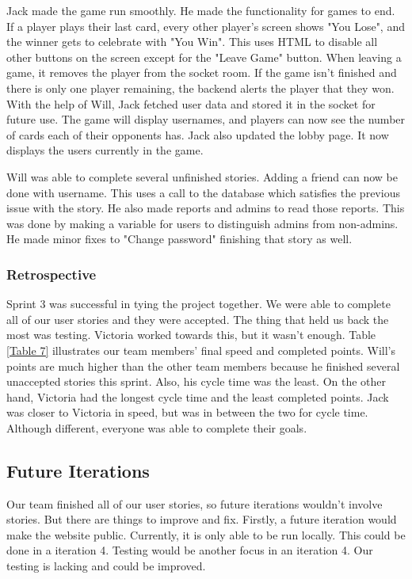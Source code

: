 Jack made the game run smoothly. He made the functionality for games to end. If a player plays their last card, every other player's screen shows "You Lose", and the winner gets to celebrate with "You Win". This uses HTML to disable all other buttons on the screen except for the "Leave Game" button. When leaving a game, it removes the player from the socket room. If the game isn't finished and there is only one player remaining, the backend alerts the player that they won. With the help of Will, Jack fetched user data and stored it in the socket for future use. The game will display usernames, and players can now see the number of cards each of their opponents has. Jack also updated the lobby page. It now displays the users currently in the game.

Will was able to complete several unfinished stories. Adding a friend can now be done with username. This uses a call to the database which satisfies the previous issue with the story. He also made reports and admins to read those reports. This was done by making a variable for users to distinguish admins from non-admins. He made minor fixes to "Change password" finishing that story as well.

\subsubsection{Retrospective}
Sprint 3 was successful in tying the project together. We were able to complete all of our user stories and they were accepted. The thing that held us back the most was testing. Victoria worked towards this, but it wasn't enough. Table \ref{Table 7} illustrates our team members' final speed and completed points. Will's points are much higher than the other team members because he finished several unaccepted stories this sprint. Also, his cycle time was the least. On the other hand, Victoria had the longest cycle time and the least completed points. Jack was closer to Victoria in speed, but was in between the two for cycle time. Although different, everyone was able to complete their goals.

\subsection{Future Iterations}
Our team finished all of our user stories, so future iterations wouldn't involve stories. But there are things to improve and fix. Firstly, a future iteration would make the website public. Currently, it is only able to be run locally. This could be done in a iteration 4. Testing would be another focus in an iteration 4. Our testing is lacking and could be improved.

